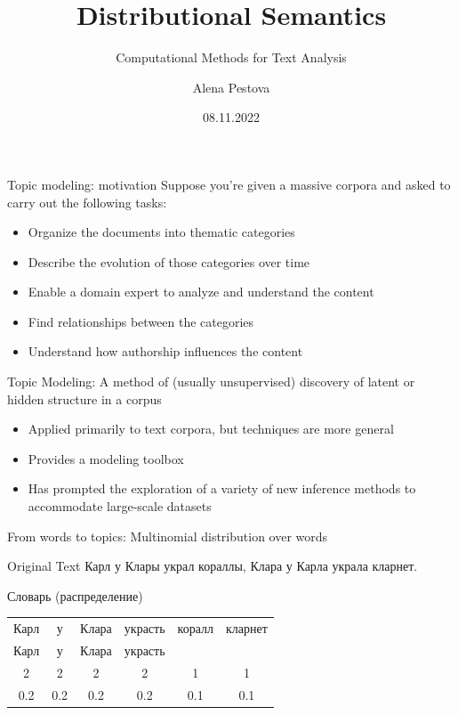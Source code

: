 \documentclass[svgnames]{beamer}
\title[CMTA 06]
{Distributional Semantics}
\subtitle
{Computational Methods for Text Analysis}
\author
{Alena Pestova}
\institute
{HSE Saint-Petersburg}
\date
{08.11.2022}
\begin{document}
    \begin{frame}
        \titlepage
    \end{frame}


    \begin{frame}{Topic modeling: motivation}
        Suppose you’re given a massive corpora and asked to carry out the
        following tasks:
        \begin{itemize}
            \item Organize the documents into thematic categories
            \item Describe the evolution of those categories over time
            \item Enable a domain expert to analyze and understand the content
            \item Find relationships between the categories
            \item Understand how authorship influences the content
        \end{itemize}

        Topic Modeling:
        A method of    (usually unsupervised)    discovery of latent or hidden structure
        in a corpus
        \begin{itemize}
            \item Applied primarily to text corpora,    but techniques are more general
            \item Provides a modeling toolbox
            \item Has prompted the exploration of a variety of new inference methods to
            accommodate large-scale datasets
        \end{itemize}
    \end{frame}

    \begin{frame}{From words to topics: Multinomial distribution over words}

        \begin{block}{Original Text}
            Карл у Клары украл кораллы, Клара у Карла украла кларнет.
        \end{block}

        \begin{block}{Словарь (распределение)}
            \begin{tabular}[c]{cccccc}
                Карл & у   & Клара & украсть & коралл & кларнет \\
                Карл & у   & Клара & украсть &        &         \\
                2    & 2   & 2     & 2       & 1      & 1       \\
                0.2  & 0.2 & 0.2   & 0.2     & 0.1    & 0.1     \\
            \end{tabular}
        \end{block}
    \end{frame}
\end{document}
